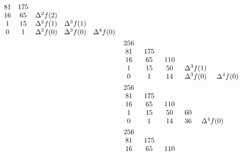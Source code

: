 \begin{example}
\begin{align*}
{\begin{array}{ccccc}
                    81  & 175 & \               & \               & \               \\
                    16  & 65  & \Delta^{2} f(2) & \               & \               \\
                    1   & 15  & \Delta^{2} f(1) & \Delta^{3} f(1) & \               \\
                    0   & 1   & \Delta^{2} f(0) & \Delta^{3} f(0) & \Delta^{4} f(0) \\
                \end{array}
        }    \\
         & {
                \arraycolsep=0.25cm
                \begin{array}{ccccc}
                    256 & \   & \   & \               & \               \\
                    81  & 175 & \   & \               & \               \\
                    16  & 65  & 110 & \               & \               \\
                    1   & 15  & 50  & \Delta^{3} f(1) & \               \\
                    0   & 1   & 14  & \Delta^{3} f(0) & \Delta^{4} f(0) \\
                \end{array}
        }    \\
         & {
                \arraycolsep=0.25cm
                \begin{array}{ccccc}
                    256 & \   & \   & \  & \               \\
                    81  & 175 & \   & \  & \               \\
                    16  & 65  & 110 & \  & \               \\
                    1   & 15  & 50  & 60 & \               \\
                    0   & 1   & 14  & 36 & \Delta^{4} f(0) \\
                \end{array}
        }    \\
         & {
                \arraycolsep=0.25cm
                \begin{array}{ccccc}
                    256 & \   & \   & \  & \  \\
                    81  & 175 & \   & \  & \  \\
                    16  & 65  & 110 & \  & \  \\

\end{array}}
\end{align*}
\end{example}
